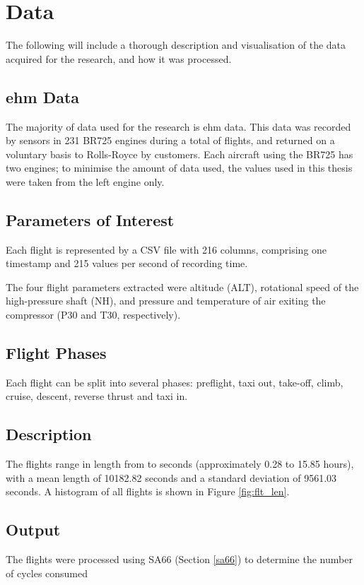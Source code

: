 \section{Data}
The following will include a thorough description and visualisation of the data acquired for the research, and how it was processed.

\subsection{\ac{ehm} Data}
The majority of data used for the research is \ac{ehm} data. This data was recorded by sensors in 231 BR725 engines during a total of  flights, and returned on a voluntary basis to Rolls-Royce by customers. Each aircraft using the BR725 has two engines; to minimise the amount of data used, the values used in this thesis were taken from the left engine only.

\subsection{Parameters of Interest}
Each flight is represented by a CSV file with 216 columns, comprising one timestamp and 215 values per second of recording time.

The four flight parameters extracted were altitude (ALT), rotational speed of the high-pressure shaft (NH), and pressure and temperature of air exiting the compressor (P30 and T30, respectively).

\subsection{Flight Phases}
Each flight can be split into several phases: preflight, taxi out, take-off, climb, cruise, descent, reverse thrust and taxi in.

\subsection{Description}
The flights range in length from  to  seconds (approximately 0.28 to 15.85 hours), with a mean length of 10182.82 seconds and a standard deviation of 9561.03 seconds. A histogram of all flights is shown in Figure \ref{fig:flt_len}.

\subsection{Output}
The flights were processed using SA66 (Section \ref{sa66}) to determine the number of cycles consumed

